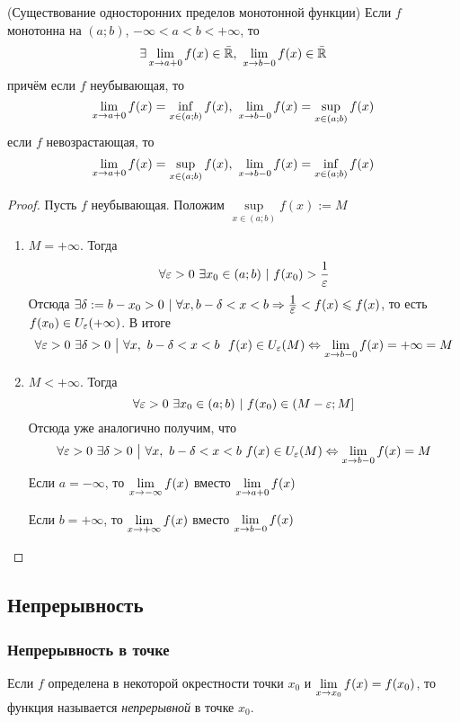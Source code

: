\begin{theorem} (Существование односторонних пределов монотонной функции)
	Если $f$ монотонна на $(a; b)$, $-\infty < a < b < +\infty$, то
	$$
		\exists \lim\limits_{x \to a+0} f(x) \in \bar{\mathbb{R}},\ \lim\limits_{x \to b-0} f(x) \in \bar{\mathbb{R}}
	$$
	причём если $f$ неубывающая, то
	$$
		\lim\limits_{x \to a+0} f(x) = \inf\limits_{x \in (a; b)} f(x),\ \lim\limits_{x \to b-0} f(x) = \sup\limits_{x \in (a; b)} f(x)
	$$
	если $f$ невозрастающая, то
	$$
		\lim\limits_{x \to a+0} f(x) = \sup\limits_{x \in (a; b)} f(x),\ \lim\limits_{x \to b-0} f(x) = \inf\limits_{x \in (a; b)} f(x)
	$$
\end{theorem}

\begin{proof}
	Пусть $f$ неубывающая. Положим $\sup\limits_{x \in (a; b)} f(x) := M$
	\begin{enumerate}
		\item $M = +\infty$. Тогда
		\[
			\forall \varepsilon > 0\ \exists x_0 \in (a; b)\ |\ f(x_0) > \frac{\displaystyle 1}{\displaystyle \varepsilon}
		\]
		Отсюда $\exists \delta := b - x_0 > 0\ |\ \forall x, b - \delta < x < b \Rightarrow \frac{\displaystyle 1}{\displaystyle \varepsilon} < f(x) \leqslant f(x)$, то есть $f(x_0) \in U_{\varepsilon}(+\infty)$. В итоге
		\[
			\forall \varepsilon > 0\ \exists \delta > 0 \ \big|\  \forall x,\ b - \delta < x < b\ \ f(x) \in U_{\varepsilon}(M) \Leftrightarrow \lim\limits_{x \to b-0} f(x) = +\infty = M
		\]
		
		\item $M < +\infty$. Тогда
		\[
			\forall \varepsilon > 0\ \exists x_0 \in (a; b)\ |\ f(x_0) \in (M - \varepsilon; M]
		\]
		Отсюда уже аналогично получим, что
		\[
			\forall \varepsilon > 0\ \exists \delta > 0 \ \big|\  \forall x,\ b - \delta < x < b\ f(x) \in U_{\varepsilon}(M) \Leftrightarrow \lim\limits_{x \to b-0} f(x) = M
		\]
		Если $a = -\infty$, то $\lim\limits_{x \to -\infty} f(x)$ вместо $\lim\limits_{x \to a+0} f(x)$
		
		Если $b = +\infty$, то $\lim\limits_{x \to +\infty} f(x)$ вместо $\lim\limits_{x \to b-0} f(x)$
		
		
	\end{enumerate}
\end{proof}

\subsection{Непрерывность}

\subsubsection*{Непрерывность в точке}

\begin{definition}
	Если $f$ определена в некоторой окрестности точки $x_0$ и $\lim\limits_{x \to x_0} f(x) = f(x_0)$, то функция называется \textit{непрерывной} в точке $x_0$.
\end{definition}

